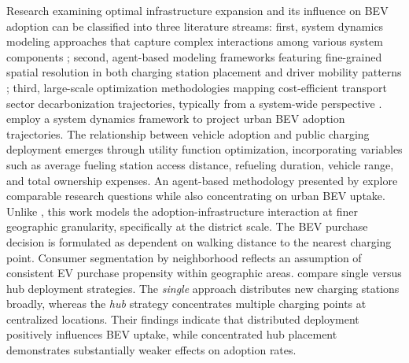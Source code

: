         Research examining optimal infrastructure expansion and its influence on \ac{BEV} adoption can be classified into three literature streams: first, system dynamics modeling approaches that capture complex interactions among various system components \citep{9706486, GAO2024103969}; second, agent-based modeling frameworks featuring fine-grained spatial resolution in both charging station placement and driver mobility patterns \citep{LIAO2023103645, WOLBERTUS2021262}; third, large-scale optimization methodologies mapping cost-efficient transport sector decarbonization trajectories, typically from a system-wide perspective \citep{TATTINI2018265}. \citet{GAO2024103969} employ a system dynamics framework to project urban \ac{BEV} adoption trajectories. The relationship between vehicle adoption and public charging deployment emerges through utility function optimization, incorporating variables such as average fueling station access distance, refueling duration, vehicle range, and total ownership expenses. An agent-based methodology presented by \citet{WOLBERTUS2021262} explore comparable research questions while also concentrating on urban \ac{BEV} uptake. Unlike \citet{GAO2024103969}, this work models the adoption-infrastructure interaction at finer geographic granularity, specifically at the district scale. The \ac{BEV} purchase decision is formulated as dependent on walking distance to the nearest charging point. Consumer segmentation by neighborhood reflects an assumption of consistent EV purchase propensity within geographic areas. \citet{WOLBERTUS2021262} compare single versus hub deployment strategies. The \textit{single} approach distributes new charging stations broadly, whereas the \textit{hub} strategy concentrates multiple charging points at centralized locations. Their findings indicate that distributed deployment positively influences \ac{BEV} uptake, while concentrated hub placement demonstrates substantially weaker effects on adoption rates.

